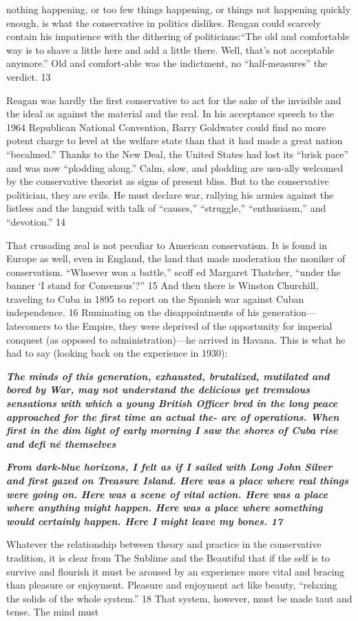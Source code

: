 nothing happening, or too few things happening, or things not happening quickly enough, is what the conservative in politics dislikes. Reagan could scarcely contain his impatience with the dithering of politicians:“The old and comfortable way is to shave a little here and add a little there. Well, that’s not acceptable anymore.” Old and comfort-able was the indictment, no “half-measures” the verdict. {\color{blue} 13 } {\par} Reagan was hardly the first conservative to act for the sake of the invisible and the ideal as against the material and the real. In his acceptance speech to the 1964 Republican National Convention, Barry Goldwater could find no more potent charge to level at the welfare state than that it had made a great nation “becalmed.” Thanks to the New Deal, the United States had lost its “brisk pace” and was now “plodding along.” Calm, slow, and plodding are usu-ally welcomed by the conservative theorist as signs of present bliss. But to the conservative politician, they are evils. He must declare war, rallying his armies against the listless and the languid with talk of “causes,” “struggle,” “enthusiasm,” and “devotion.” {\color{blue} 14 } {\par} That crusading zeal is not peculiar to American conservatism. It is found in Europe as well, even in England, the land that made moderation the moniker of conservatism. “Whoever won a battle,” scoff ed Margaret Thatcher, “under the banner ‘I stand for Consensus’?” {\color{blue} 15 } And then there is Winston Churchill, traveling to Cuba in 1895 to report on the Spanish war against Cuban independence. {\color{blue} 16 } Ruminating on the disappointments of his generation— latecomers to the Empire, they were deprived of the opportunity for imperial conquest (as opposed to administration)—he arrived in Havana. This is what he had to say (looking back on the experience in 1930):{\par} {\textbf{\textit{The minds of this generation, exhausted, brutalized, mutilated and bored by War, may not understand the delicious yet tremulous sensations with which a young British Officer bred in the long peace approached for the first time an actual the- are of operations. When first in the dim light of early morning I saw the shores of Cuba rise and defi né themselves} } }{\par} {\par} {\textbf{\textit{From dark-blue horizons, I felt as if I sailed with Long John Silver and first gazed on Treasure Island. Here was a place where real things were going on. Here was a scene of vital action. Here was a place where anything might happen. Here was a place where something would certainly happen. Here I might leave my bones. {\color{blue} 17 } } } }{\par} Whatever the relationship between theory and practice in the conservative tradition, it is clear from The Sublime and the Beautiful that if the self is to survive and flourish it must be aroused by an experience more vital and bracing than pleasure or enjoyment. Pleasure and enjoyment act like beauty, “relaxing the solids of the whole system.” {\color{blue} 18 } That system, however, must be made taut and tense. The mind must 
